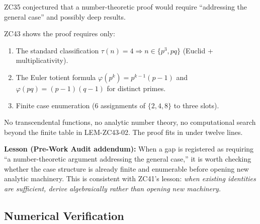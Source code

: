 \documentclass[12pt, a4paper]{article}
\providecommand{\phitot}{\varphi}
\begin{document}
\begin{derivedbox}[title={FIND-ZC43-01: Algebraic Sufficiency
  (Methodological Note)}]
ZC35 conjectured that a number-theoretic proof would require
``addressing the general case'' and possibly deep results.

ZC43 shows the proof requires only:
\begin{enumerate}[leftmargin=*, noitemsep]
\item The standard classification $\tau(n) = 4
  \Rightarrow n \in \{p^3, pq\}$ (Euclid + multiplicativity).
\item The Euler totient formula $\phitot(p^k) = p^{k-1}(p-1)$
  and $\phitot(pq) = (p-1)(q-1)$ for distinct primes.
\item Finite case enumeration (6 assignments of $\{2,4,8\}$
  to three slots).
\end{enumerate}

No transcendental functions, no analytic number theory,
no computational search beyond the finite table in
LEM-ZC43-02. The proof fits in under twelve lines.

\textbf{Lesson (Pre-Work Audit addendum):}
When a gap is registered as requiring ``a number-theoretic
argument addressing the general case,'' it is worth checking
whether the case structure is already finite and enumerable
before opening new analytic machinery.
This is consistent with ZC41's lesson:
\textit{when existing identities are sufficient, derive
algebraically rather than opening new machinery.}
\end{derivedbox}

\subsection{Numerical Verification}

\end{document}
